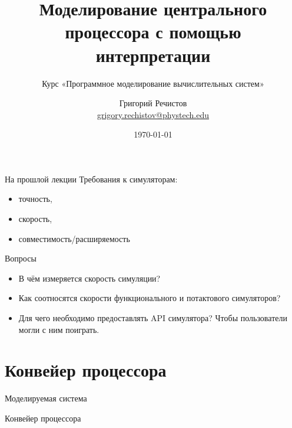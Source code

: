 \documentclass{beamer}
\title{Моделирование центрального процессора с помощью интерпретации}
\subtitle{Курс «Программное моделирование вычислительных систем»}
\author[]{Григорий Речистов \\ \small{\href{mailto:grigory.rechistov@phystech.edu}{grigory.rechistov@phystech.edu}}}
\date{\today}
\begin{document}
\begin{frame}
    \maketitle
\end{frame}

\begin{frame}
    \tableofcontents
\end{frame}

\begin{frame}{На прошлой лекции}
Требования к симуляторам:
\begin{itemize}
\item точность,
\item скорость,
\item совместимость/расширяемость
\end{itemize}

\end{frame}

\begin{frame}{Вопросы}
\begin{itemize}
\item В чём измеряется скорость симуляции? \pause
\item Как соотносятся скорости функционального и потактового симуляторов? \pause
\item Для чего необходимо предоставлять API симулятора? \pause Чтобы пользователи могли с ним поиграть.
\end{itemize}

\end{frame}



\section{Конвейер процессора}

\begin{frame}{Моделируемая система}
\centering
\vfill

\vfill
\end{frame}

\begin{frame}[shrink=0.8]{Конвейер процессора}
\centering

\end{frame}
\end{document}
